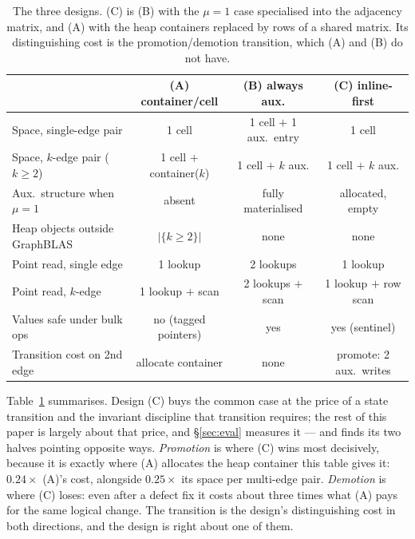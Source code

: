\documentclass[11pt,a4paper]{article}
\theoremstyle{plain}
\theoremstyle{definition}
\theoremstyle{remark}
\begin{document}
\begin{table}[t]
\centering
\small
\setlength{\tabcolsep}{3.8pt}
\begin{tabular}{@{}lccc@{}}
\toprule
 & \textbf{(A) container/cell} & \textbf{(B) always aux.} & \textbf{(C) inline-first} \\
\midrule
Space, single-edge pair      & 1 cell                & 1 cell $+$ 1 aux.\ entry & 1 cell \\
Space, $k$-edge pair ($k\ge2$) & 1 cell $+$ container($k$) & 1 cell $+$ $k$ aux.    & 1 cell $+$ $k$ aux. \\
Aux.\ structure when $\mu=1$ & absent                & fully materialised       & allocated, empty \\
Heap objects outside GraphBLAS & $|\{k\ge2\}|$        & none                     & none \\
Point read, single edge      & 1 lookup              & 2 lookups                & 1 lookup \\
Point read, $k$-edge         & 1 lookup $+$ scan     & 2 lookups $+$ scan       & 1 lookup $+$ row scan \\
Values safe under bulk ops   & no (tagged pointers)  & yes                      & yes (sentinel) \\
Transition cost on 2nd edge  & allocate container    & none                     & promote: 2 aux.\ writes \\
\bottomrule
\end{tabular}
\caption{The three designs. (C) is (B) with the $\mu = 1$ case specialised
into the adjacency matrix, and (A) with the heap containers replaced by rows
of a shared matrix. Its distinguishing cost is the promotion/demotion
transition, which (A) and (B) do not have.}
\label{tab:designspace}
\end{table}

Table~\ref{tab:designspace} summarises. Design (C) buys the common case at
the price of a state transition and the invariant discipline that transition
requires; the rest of this paper is largely about that price, and
\S\ref{sec:eval} measures it --- and finds its two halves pointing opposite
ways. \emph{Promotion} is where (C) wins most decisively, because it is exactly
where (A) allocates the heap container this table gives it: $0.24\times$ (A)'s
cost, alongside $0.25\times$ its space per multi-edge pair. \emph{Demotion} is
where (C) loses: even after a defect fix it costs about three times what (A)
pays for the same logical change. The transition is the design's distinguishing
cost in both directions, and the design is right about one of them.
\end{document}
